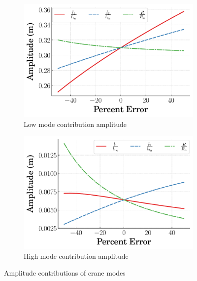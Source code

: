 \begin{figure}[t]
     \centering
     \begin{subfigure}[b]{0.49\textwidth}
         \centering
         \includegraphics[width=\textwidth]{figures/figures_robustness/dpcrane_low_mode_amplitude.pdf}
         \caption{Low mode contribution amplitude}
         \label{subfig_chap4:dpcrane_low_mode_amplitude}
     \end{subfigure}
     \hfill
     \begin{subfigure}[b]{0.49\textwidth}
         \centering
         \includegraphics[width=\textwidth]{figures/figures_robustness/dpcrane_high_mode_amplitude.pdf}
         \caption{High mode contribution amplitude}
         \label{subfig_chap4:dpcrane_high_mode_amplitude}
     \end{subfigure}
        \caption{Amplitude contributions of crane modes}
        \label{fig_chap4:dpcrane_modes_amplitude}
\end{figure}

